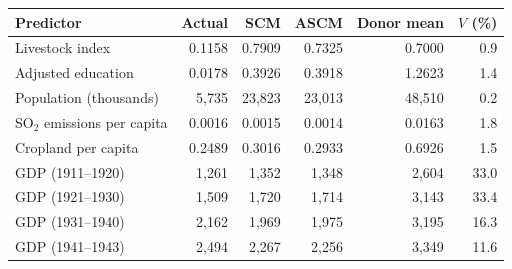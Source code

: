 \begin{tabular}{lrrrrr}
\toprule
Predictor & Actual & SCM & ASCM & Donor mean & $V$ (\%) \\
\midrule
Livestock index & 0.1158 & 0.7909 & 0.7325 & 0.7000 & 0.9 \\
Adjusted education & 0.0178 & 0.3926 & 0.3918 & 1.2623 & 1.4 \\
Population (thousands) & 5,735 & 23,823 & 23,013 & 48,510 & 0.2 \\
SO$_2$ emissions per capita & 0.0016 & 0.0015 & 0.0014 & 0.0163 & 1.8 \\
Cropland per capita & 0.2489 & 0.3016 & 0.2933 & 0.6926 & 1.5 \\
GDP (1911--1920) & 1,261 & 1,352 & 1,348 & 2,604 & 33.0 \\
GDP (1921--1930) & 1,509 & 1,720 & 1,714 & 3,143 & 33.4 \\
GDP (1931--1940) & 2,162 & 1,969 & 1,975 & 3,195 & 16.3 \\
GDP (1941--1943) & 2,494 & 2,267 & 2,256 & 3,349 & 11.6 \\
\bottomrule
\end{tabular}
